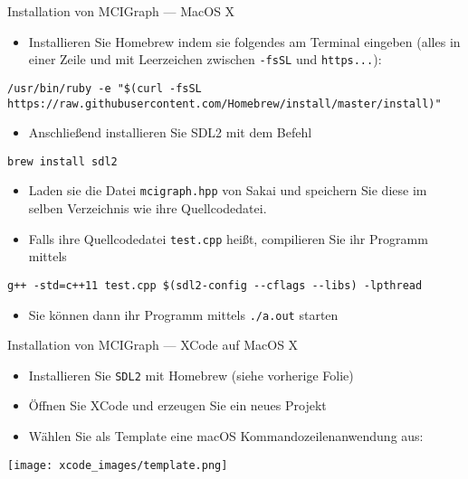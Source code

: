 \documentclass[presentation]{beamer}
\begin{document}
\begin{frame}[label={sec:org1b1813a},fragile]{Installation von MCIGraph --- MacOS X}
 \begin{itemize}
\item Installieren Sie Homebrew indem sie folgendes am Terminal eingeben
(alles in einer Zeile und mit Leerzeichen zwischen {\color{solarizedYellow}\verb!-fsSL!} und
{\color{solarizedYellow}\verb!https...!}):
\end{itemize}
\begin{verbatim}
/usr/bin/ruby -e "$(curl -fsSL
https://raw.githubusercontent.com/Homebrew/install/master/install)"
\end{verbatim}
\begin{itemize}
\item Anschließend installieren Sie SDL2 mit dem Befehl
\end{itemize}
\begin{verbatim}
brew install sdl2
\end{verbatim}
\begin{itemize}
\item Laden sie die Datei {\color{solarizedYellow}\verb!mcigraph.hpp!} von Sakai und speichern Sie diese
im selben Verzeichnis wie ihre Quellcodedatei.
\item Falls ihre Quellcodedatei {\color{solarizedYellow}\verb!test.cpp!} heißt, compilieren Sie ihr
Programm mittels
\end{itemize}
\begin{verbatim}
g++ -std=c++11 test.cpp $(sdl2-config --cflags --libs) -lpthread
\end{verbatim}
\begin{itemize}
\item Sie können dann ihr Programm mittels {\color{solarizedYellow}\verb!./a.out!} starten
\end{itemize}
\end{frame}
\begin{frame}[label={sec:orgfc491bd},fragile]{Installation von MCIGraph --- XCode auf MacOS X}
 \begin{itemize}
\item Installieren Sie {\color{solarizedYellow}\verb!SDL2!} mit Homebrew (siehe vorherige Folie)
\item Öffnen Sie XCode und erzeugen Sie ein neues Projekt
\item Wählen Sie als Template eine macOS Kommandozeilenanwendung aus:
\end{itemize}
\begin{center}
\texttt{[image: xcode\_images/template.png]}
\end{center}
\end{frame}
\end{document}
